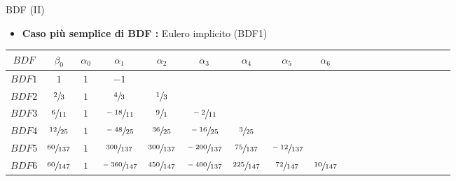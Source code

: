 \documentclass[aspectratio=169, 10pt, handout,usenames,dvipsnames]{beamer}
\begin{document}
    \begin{frame}{BDF (II)}
        \begin{itemize}
            \item \textbf{Caso più semplice di BDF :} Eulero implicito (BDF1)
        \end{itemize}
        
        \begin{table}[]
            \begin{tabular}{Sc|Sc|Sc|ScScScScScScSc}
            \( BDF \)& \(\beta_0\) & \(\alpha_0\) & \(\alpha_1\) & \(\alpha_2\)  & \(\alpha_3\) & \(\alpha_4\) & \(\alpha_5\) & \(\alpha_6\) \\
            \hline
            \(BDF1\)& \(1 \)       & \(1 \) & \(-1\)       &                             &          &         &         &        \\
            \(BDF2\)& \(\sfrac{2}{3} \)    & \(1\) & \(\sfrac{4}{3} \)     & \(\sfrac{1}{3} \)                         &          &         &         &        \\
            \(BDF3\)& \(\sfrac{6}{11} \)   & \(1\) & \(\sfrac{-18}{11} \)   & \(\sfrac{9}{1} \)                       & \(\sfrac{-2}{11}\)    &         &         &        \\
            \(BDF4\)& \(\sfrac{12}{25} \)  & \(1\) & \(\sfrac{-48}{25} \)   & \(\sfrac{36}{25} \)   & \(\sfrac{-16}{25}\)   & \(\sfrac{3}{25}\)   &         &        \\
            \(BDF5\)& \(\sfrac{60}{137} \) & \(1\) & \(\sfrac{300}{137} \)  & \(\sfrac{300}{137}\) & \(\sfrac{-200}{137}\) & \(\sfrac{75}{137}\)  & \(\sfrac{-12}{137}\) &        \\
            \(BDF6\)& \(\sfrac{60}{147} \) & \(1\) & \(\sfrac{-360}{147} \) & \(\sfrac{450}{147}\) & \(\sfrac{-400}{137}\) & \(\sfrac{225}{147}\) & \(\sfrac{72}{147}\) & \(\sfrac{10}{147}\)
            \end{tabular}
        \end{table}
    \end{frame}
    
    
\end{document}
